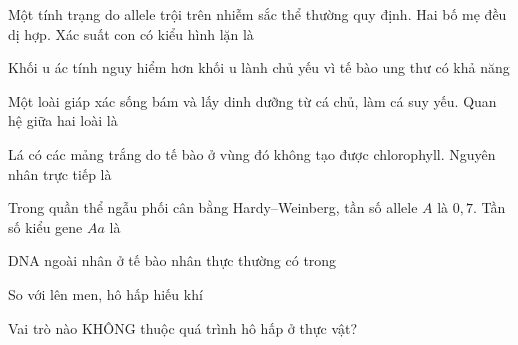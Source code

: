 \begin{ex}
Một tính trạng do allele trội trên nhiễm sắc thể thường quy định. Hai bố mẹ đều dị hợp. Xác suất con có kiểu hình lặn là
\end{ex}

\begin{ex}
Khối u ác tính nguy hiểm hơn khối u lành chủ yếu vì tế bào ung thư có khả năng
\end{ex}

\begin{ex}
Một loài giáp xác sống bám và lấy dinh dưỡng từ cá chủ, làm cá suy yếu. Quan hệ giữa hai loài là
\end{ex}

\begin{ex}
Lá có các mảng trắng do tế bào ở vùng đó không tạo được chlorophyll. Nguyên nhân trực tiếp là
\end{ex}

\begin{ex}
Trong quần thể ngẫu phối cân bằng Hardy--Weinberg, tần số allele $A$ là $0{,}7$. Tần số kiểu gene $Aa$ là
\end{ex}

\begin{ex}
DNA ngoài nhân ở tế bào nhân thực thường có trong
\end{ex}

\begin{ex}
So với lên men, hô hấp hiếu khí
\end{ex}

\begin{ex}
Vai trò nào KHÔNG thuộc quá trình hô hấp ở thực vật?
\end{ex}

